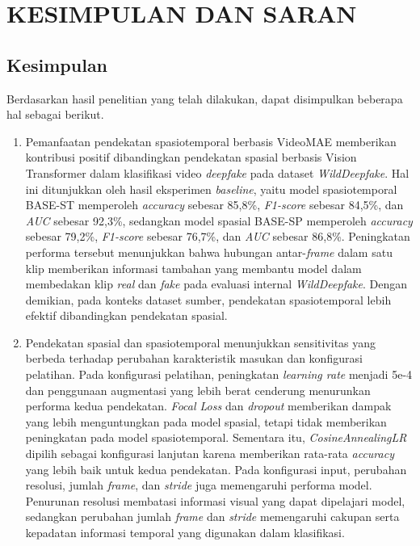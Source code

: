 \newpage
\chapter{KESIMPULAN DAN SARAN} \label{Bab V}

\section{Kesimpulan} \label{V.Kesimpulan}
Berdasarkan hasil penelitian yang telah dilakukan, dapat disimpulkan beberapa hal sebagai berikut. \par

\begin{enumerate}[noitemsep]
	\item Pemanfaatan pendekatan spasiotemporal berbasis VideoMAE memberikan kontribusi positif dibandingkan pendekatan spasial berbasis Vision Transformer dalam klasifikasi video \textit{deepfake} pada dataset \textit{WildDeepfake}. Hal ini ditunjukkan oleh hasil eksperimen \textit{baseline}, yaitu model spasiotemporal BASE-ST memperoleh \textit{accuracy} sebesar 85,8\%, \textit{F1-score} sebesar 84,5\%, dan \textit{AUC} sebesar 92,3\%, sedangkan model spasial BASE-SP memperoleh \textit{accuracy} sebesar 79,2\%, \textit{F1-score} sebesar 76,7\%, dan \textit{AUC} sebesar 86,8\%. Peningkatan performa tersebut menunjukkan bahwa hubungan antar-\textit{frame} dalam satu klip memberikan informasi tambahan yang membantu model dalam membedakan klip \textit{real} dan \textit{fake} pada evaluasi internal \textit{WildDeepfake}. Dengan demikian, pada konteks dataset sumber, pendekatan spasiotemporal lebih efektif dibandingkan pendekatan spasial.
	\item Pendekatan spasial dan spasiotemporal menunjukkan sensitivitas yang berbeda terhadap perubahan karakteristik masukan dan konfigurasi pelatihan. Pada konfigurasi pelatihan, peningkatan \textit{learning rate} menjadi 5e-4 dan penggunaan augmentasi yang lebih berat cenderung menurunkan performa kedua pendekatan. \textit{Focal Loss} dan \textit{dropout} memberikan dampak yang lebih menguntungkan pada model spasial, tetapi tidak memberikan peningkatan pada model spasiotemporal. Sementara itu, \textit{CosineAnnealingLR} dipilih sebagai konfigurasi lanjutan karena memberikan rata-rata \textit{accuracy} yang lebih baik untuk kedua pendekatan. Pada konfigurasi input, perubahan resolusi, jumlah \textit{frame}, dan \textit{stride} juga memengaruhi performa model. Penurunan resolusi membatasi informasi visual yang dapat dipelajari model, sedangkan perubahan jumlah \textit{frame} dan \textit{stride} memengaruhi cakupan serta kepadatan informasi temporal yang digunakan dalam klasifikasi.

\end{enumerate}
